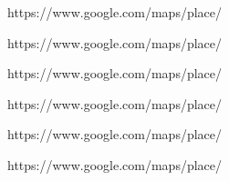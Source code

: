 https://www.google.com/maps/place/%

https://www.google.com/maps/place/%

https://www.google.com/maps/place/%

https://www.google.com/maps/place/%

https://www.google.com/maps/place/%

https://www.google.com/maps/place/%

